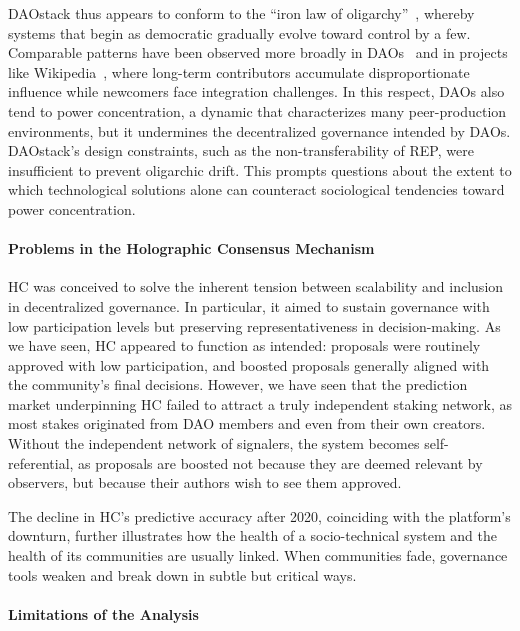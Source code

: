 \documentclass[10pt,lineno]{wlpeerj}
\begin{document}
DAOstack thus appears to conform to the ``iron law of oligarchy''~\citep{shaw_laboratories_2014}, whereby systems that begin as democratic gradually evolve toward control by a few. Comparable patterns have been observed more broadly in DAOs~\citep{pena-calvin_concentration_2024} and in projects like Wikipedia~\citep{rijshouwer_wikipedia_2023}, where long-term contributors accumulate disproportionate influence while newcomers face integration challenges. In this respect, DAOs also tend to power concentration, a dynamic that characterizes many peer-production environments,  but it undermines the decentralized governance intended by DAOs. DAOstack’s design constraints, such as the non-transferability of REP, were insufficient to prevent oligarchic drift. This prompts questions about the extent to which technological solutions alone can counteract sociological tendencies toward power concentration.


\paragraph{Problems in the Holographic Consensus Mechanism}


HC was conceived to solve the inherent tension between scalability and inclusion in decentralized governance. In particular, it aimed to sustain governance with low participation levels but preserving representativeness in decision-making. As we have seen, HC appeared to function as intended: proposals were routinely approved with low participation, and boosted proposals generally aligned with the community’s final decisions. However, we have seen that the prediction market underpinning HC failed to attract a truly independent staking network, as most stakes originated from DAO members and even from their own creators. Without the independent network of signalers, the system becomes self-referential, as proposals are boosted not because they are deemed relevant by observers, but because their authors wish to see them approved.

The decline in HC’s predictive accuracy after 2020, coinciding with the platform’s downturn, further illustrates how the health of a socio-technical system and the health of its communities are usually linked. When communities fade, governance tools weaken and break down in subtle but critical ways. 

\paragraph{Limitations of the Analysis}
\end{document}
